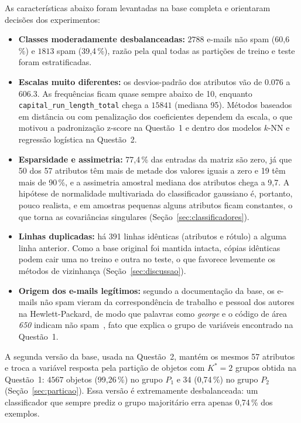 \documentclass[11pt,a4paper]{article}
\begin{document}
As características abaixo foram levantadas na base completa e orientaram decisões dos experimentos:

\begin{itemize}
\item \textbf{Classes moderadamente desbalanceadas:} $\num{2788}$ e-mails não spam (60,6\,\%) e $\num{1813}$ spam
  (39,4\,\%), razão pela qual todas as partições de treino e teste foram estratificadas.
\item \textbf{Escalas muito diferentes:} os desvios-padrão dos atributos vão de $\num{0.076}$ a $\num{606.3}$. As
  frequências ficam quase sempre abaixo de 10, enquanto \texttt{capital\_run\_length\_total} chega a
  $\num{15841}$ (mediana 95). Métodos baseados em distância ou com penalização dos coeficientes dependem da
  escala, o que motivou a padronização z-score na Questão~1 e dentro dos modelos $k$-NN e regressão logística na
  Questão~2.
\item \textbf{Esparsidade e assimetria:} 77,4\,\% das entradas da matriz são zero, já que 50 dos 57 atributos têm
  mais de metade dos valores iguais a zero e 19 têm mais de 90\,\%, e a assimetria amostral mediana dos atributos
  chega a 9,7. A hipótese de normalidade multivariada do classificador gaussiano é, portanto, pouco realista, e em amostras
  pequenas alguns atributos ficam constantes, o que torna as covariâncias singulares
  (Seção~\ref{sec:classificadores}).
\item \textbf{Linhas duplicadas:} há 391 linhas idênticas (atributos e rótulo) a alguma linha anterior. Como a base
  original foi mantida intacta, cópias idênticas podem cair uma no treino e outra no teste, o que favorece
  levemente os métodos de vizinhança (Seção~\ref{sec:discussao}).
\item \textbf{Origem dos e-mails legítimos:} segundo a documentação da base, os e-mails não spam vieram da
  correspondência de trabalho e pessoal dos autores na Hewlett-Packard, de modo que palavras como
  \textit{george} e o código de área \textit{650} indicam não spam~\cite{hopkins1999spambase}, fato que
  explica o grupo de variáveis encontrado na Questão~1.
\end{itemize}

A segunda versão da base, usada na Questão~2, mantém os mesmos 57 atributos e troca a variável resposta pela
partição de objetos com $K^*=2$ grupos obtida na Questão~1: $\num{4567}$ objetos (99,26\,\%) no grupo $P_1$ e
34 (0,74\,\%) no grupo $P_2$ (Seção~\ref{sec:particao}). Essa versão é extremamente desbalanceada: um classificador
que sempre prediz o grupo majoritário erra apenas 0,74\,\% dos exemplos.
\end{document}
